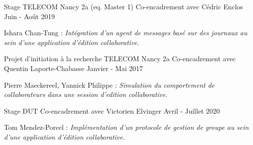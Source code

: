 
\begin{cventries}

\cventry
  {Stage TELECOM Nancy 2a (eq. Master 1)}
  {Co-encadrement avec Cédric Enclos}
  {}
  {Juin - Août 2019}
  {
    \begin{cvparagraph}
      Ishara Chan-Tung : \emph{Intégration d'un agent de messages basé sur des journaux au sein d'une application d'édition collaborative}.
    \end{cvparagraph}
}

\vspace{-1em}
\cventry
  {Projet d'initiation à la recherche TELECOM Nancy 2a}
  {Co-encadrement avec Quentin Laporte-Chabasse}
  {}
  {Janvier - Mai 2017}
  {
    \begin{cvparagraph}
      Pierre Maeckereel, Yannick Philippe : \emph{Simulation du comportement de collaborateurs dans une session d'edition collaborative}.
    \end{cvparagraph}
  }

\vspace{-1em}
\cventry
  {Stage DUT}
  {Co-encadrement avec Victorien Elvinger}
  {}
  {Avril - Juillet 2020}
  {
    \begin{cvparagraph}
      Tom Mendez-Porcel : \emph{Implémentation d'un protocole de gestion de groupe au sein d'une application d'édition collaborative}.
    \end{cvparagraph}
  }
\end{cventries}
